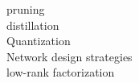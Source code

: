 \documentclass[../Main.tex]{subfiles}
\begin{document}
pruning\\
distillation\\
Quantization\\
Network design strategies\\
low-rank factorization
\end{document}
